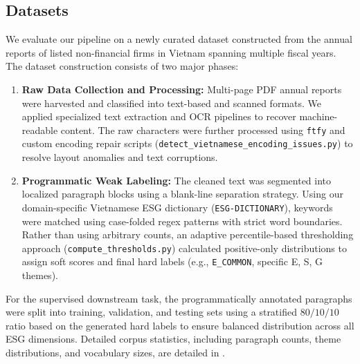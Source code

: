 \documentclass{article}
\theoremstyle{plain}
\theoremstyle{definition}
\theoremstyle{remark}
\begin{document}
\subsection{Datasets}
We evaluate our pipeline on a newly curated dataset constructed from the annual reports of listed non-financial firms in Vietnam spanning multiple fiscal years. The dataset construction consists of two major phases:
\begin{enumerate}
    \item \textbf{Raw Data Collection and Processing:} Multi-page PDF annual reports were harvested and classified into text-based and scanned formats. We applied specialized text extraction and OCR pipelines to recover machine-readable content. The raw characters were further processed using \texttt{ftfy} and custom encoding repair scripts (\texttt{detect\_vietnamese\_encoding\_issues.py}) to resolve layout anomalies and text corruptions.
    \item \textbf{Programmatic Weak Labeling:} The cleaned text was segmented into localized paragraph blocks using a blank-line separation strategy. Using our domain-specific Vietnamese ESG dictionary (\texttt{ESG-DICTIONARY}), keywords were matched using case-folded regex patterns with strict word boundaries. Rather than using arbitrary counts, an adaptive percentile-based thresholding approach (\texttt{compute\_thresholds.py}) calculated positive-only distributions to assign soft scores and final hard labels (e.g., \texttt{E\_COMMON}, specific E, S, G themes). 
\end{enumerate}
For the supervised downstream task, the programmatically annotated paragraphs were split into training, validation, and testing sets using a stratified $80/10/10$ ratio based on the generated hard labels to ensure balanced distribution across all ESG dimensions. Detailed corpus statistics, including paragraph counts, theme distributions, and vocabulary sizes, are detailed in .



\end{document}
